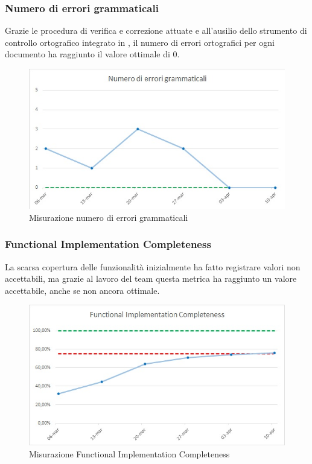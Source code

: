 \subsubsection{Numero di errori grammaticali}
Grazie le procedura di verifica e correzione attuate e all'ausilio dello strumento di controllo ortografico integrato in , il numero di errori ortografici per ogni documento ha raggiunto il valore ottimale di 0.
\begin{figure} [H]
	\centering
	\includegraphics[scale=1]{Img/gramm}
	\caption{Misurazione numero di errori grammaticali}\label{}
\end{figure}

\subsubsection{Functional Implementation Completeness}
La scarsa copertura delle funzionalità inizialmente ha fatto registrare valori non accettabili, ma grazie al lavoro del team questa metrica ha raggiunto un valore accettabile, anche se non ancora ottimale.
\begin{figure} [H]
	\centering
	\includegraphics[scale=1]{Img/FIC}
	\caption{Misurazione Functional Implementation Completeness}\label{}
\end{figure}

